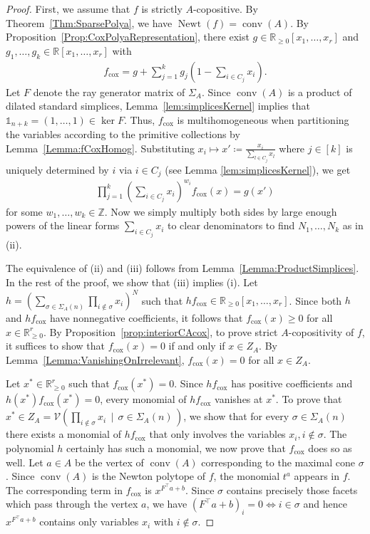 \documentclass[a4paper,11pt]{amsart}
\theoremstyle{definition}
\DeclareMathOperator{\conv}{conv}
\DeclareMathOperator{\Newt}{Newt}
\newcommand{\ZZ}{\mathbb{Z}}
\newcommand{\RR}{\mathbb{R}}
\newcommand{\cox}{\mathrm{cox}}
\begin{document}
\begin{proof}
    First, we assume that $f$ is strictly $A$-copositive. By Theorem~\ref{Thm:SparsePolya}, we have $\Newt(f) = \conv(A)$. By Proposition~\ref{Prop:CoxPolyaRepresentation}, there exist $g \in \mathbb{R}_{\geq 0}[x_1,\dots,x_r]$ and $g_1,\ldots,g_k\in \RR[x_1,\dots,x_r]$ with
    \begin{align}
    \label{Eq:CoxPolyaRepresentation_proof}
    f_\cox= g+\sum_{j=1}^k g_j\left(1-\sum_{i\in C_j}x_i\right).
\end{align}
Let $F$ denote the ray generator matrix of $\Sigma_A$. Since $\conv(A)$ is a product of dilated standard simplices, Lemma~\ref{lem:simplicesKernel} implies that $\mathds{1}_{n+k} = (1,\dots,1) \in \ker F$. Thus, $f_\cox$ is multihomogeneous when partitioning the variables according to the primitive collections by Lemma~\ref{Lemma:fCoxHomog}. 
Substituting $x_i\mapsto x' \coloneq \frac{x_i}{\sum_{l\in C_j}x_l}$ where $j \in [k]$ is uniquely determined by $i$ via $i\in C_j$ (see Lemma \ref{lem:simplicesKernel}), we get
\begin{align}
\label{eq:proof_changeofcoords}
    \prod_{j=1}^k\left(\sum_{i\in C_j}x_i\right)^{w_i}f_\cox(x)=g(x')
\end{align}
for some $w_1,\dots,w_k \in \ZZ$.
Now we simply multiply both sides by large enough powers of the linear forms $\sum_{i\in C_j}x_i$ to clear denominators to find $N_1,\dots,N_k$ as in (ii).

The equivalence of (ii) and (iii) follows from Lemma~\ref{Lemma:ProductSimplices}. In the rest of the proof, we show that (iii) implies (i). Let $h = \left(\sum_{\sigma \in \Sigma_A(n)} \prod_{i \notin \sigma} x_i  \right)^N $ such that $hf_\cox \in \RR_{\geq0}[x_1,\dots,x_r]$. Since both $h$ and $hf_\cox$ have nonnegative coefficients, it follows that $f_\cox(x) \geq 0$ for all $x \in \RR^r_{\geq0}$. By Proposition~\ref{prop:interiorCAcox}, to prove strict $A$-copositivity of $f$, it suffices to show that $f_\cox(x) = 0$ if and only if $x \in Z_A$. By Lemma~\ref{Lemma:VanishingOnIrrelevant}, $f_\cox(x) = 0$ for all $x \in Z_A$. 

Let $x^* \in \mathbb{R}^r_{\geq0}$ such that $f_\cox(x^*) = 0$. Since $hf_\cox$ has positive coefficients and $h(x^*)f_\cox(x^*)=0$, every monomial of $hf_\cox$ vanishes at $x^*$. To prove that $x^* \in Z_A = \mathcal{V}( \prod_{i \notin \sigma} x_i \, \mid \, \sigma \in \Sigma_A(n) \,)$, we show that for every $\sigma \in \Sigma_A(n)$ there exists a monomial of $hf_\cox$ that only involves the variables $x_i, i \notin \sigma$. The polynomial $h$ certainly has such a monomial, we now prove that $f_\cox$ does so as well.
Let $a \in A$ be the vertex of $\conv(A)$ corresponding to the maximal cone $\sigma$. 
Since $\conv(A)$ is the Newton polytope of $f$, the monomial $t^a$ appears in $f$.
The corresponding term in $f_\cox$ is $x^{F^\top a+b}$.
Since $\sigma$ contains precisely those facets which pass through the vertex $a$, we have $(F^\top a+b)_i=0 \Leftrightarrow i \in \sigma$ and hence $x^{F^\top a+b}$ contains only variables $x_i$ with $i\notin \sigma$.


\end{proof}
\end{document}
